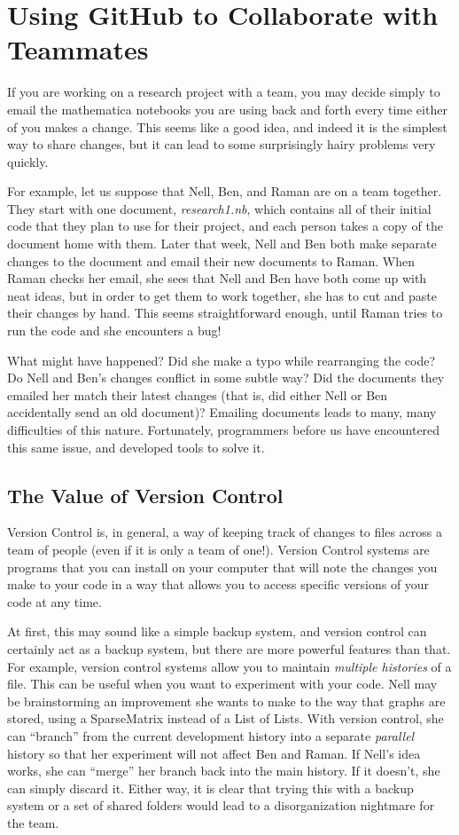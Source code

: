 \chapter{Using GitHub to Collaborate with Teammates}

If you are working on a research project with a team, you may decide simply to email the mathematica notebooks you are using back and forth every time either of you makes a change. This seems like a good idea, and indeed it is the simplest way to share changes, but it can lead to some surprisingly hairy problems very quickly.

For example, let us suppose that Nell, Ben, and Raman are on a team together. They start with one document, \emph{research1.nb}, which contains all of their initial code that they plan to use for their project, and each person takes a copy of the document home with them. Later that week, Nell and Ben both make separate changes to the document and email their new documents to Raman. When Raman checks her email, she sees that Nell and Ben have both come up with neat ideas, but in order to get them to work together, she has to cut and paste their changes by hand. This seems straightforward enough, until Raman tries to run the code and she encounters a bug!

What might have happened? Did she make a typo while rearranging the code? Do Nell and Ben's changes conflict in some subtle way? Did the documents they emailed her match their latest changes (that is, did either Nell or Ben accidentally send an old document)? Emailing documents leads to many, many difficulties of this nature. Fortunately, programmers before us have encountered this same issue, and developed tools to solve it.

\section{The Value of Version Control}

Version Control is, in general, a way of keeping track of changes to files across a team of people (even if it is only a team of one!). Version Control systems are programs that you can install on your computer that will note the changes you make to your code in a way that allows you to access specific versions of your code at any time.

At first, this may sound like a simple backup system, and version control can certainly act as a backup system, but there are more powerful features than that. For example, version control systems allow you to maintain \emph{multiple histories} of a file. This can be useful when you want to experiment with your code. Nell may be brainstorming an improvement she wants to make to the way that graphs are stored, using a SparseMatrix instead of a List of Lists. With version control, she can ``branch'' from the current development history into a separate \emph{parallel} history so that her experiment will not affect Ben and Raman. If Nell's idea works, she can ``merge'' her branch back into the main history. If it doesn't, she can simply discard it. Either way, it is clear that trying this with a backup system or a set of shared folders would lead to a disorganization nightmare for the team.


